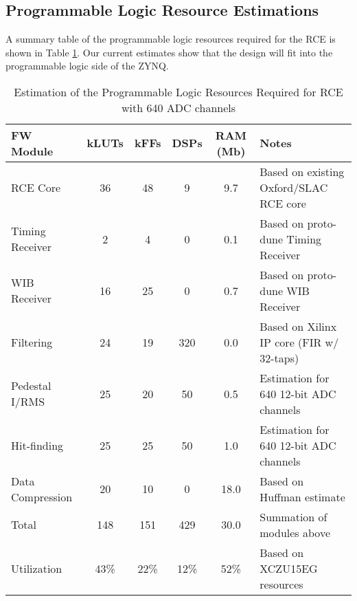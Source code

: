 \subsection{ Programmable Logic Resource Estimations }

A summary table of the programmable logic resources required for the RCE is shown in Table \ref{tab:FpgaResources}. Our current estimates show that the design will fit into the programmable logic side of the ZYNQ.  

\begin{table}[tb]
\centering
\begin{tabular}{|l|c|c|c|c|l|}
\hline
FW Module        & kLUTs & kFFs & DSPs & RAM (Mb) & Notes                                    \\ \hline
RCE Core         & 36    & 48   & 9    & 9.7      & Based on existing Oxford/SLAC RCE core   \\ \hline
Timing Receiver  & 2     & 4    & 0    & 0.1      & Based on proto-dune Timing Receiver      \\ \hline
WIB Receiver     & 16    & 25   & 0    & 0.7      & Based on proto-dune WIB Receiver         \\ \hline
Filtering        & 24    & 19   & 320  & 0.0      & Based on Xilinx IP core (FIR w/ 32-taps) \\ \hline
Pedestal I/RMS   & 25    & 20   & 50   & 0.5      & Estimation for 640 12-bit ADC channels   \\ \hline
Hit-finding      & 25    & 25   & 50   & 1.0      & Estimation for 640 12-bit ADC channels   \\ \hline
Data Compression & 20    & 10   & 0    & 18.0     & Based on Huffman estimate                \\ \hline
\rowcolor[HTML]{FFFFC7} 
Total            & 148 & 151 & 429  & 30.0        & Summation of modules above               \\ \hline
\rowcolor[HTML]{67FD9A} 
Utilization      & 43\%   & 22\%   & 12\% & 52\%  & Based on XCZU15EG resources              \\ \hline
\end{tabular}
\caption{ Estimation of the Programmable Logic Resources Required for RCE with 640 ADC channels }
\label{tab:FpgaResources}
\end{table}

